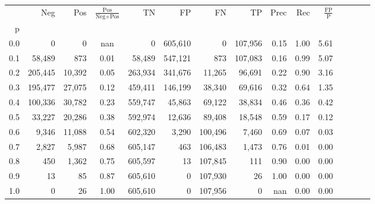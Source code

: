 \begin{tabular}{rrrcrrrrrrrrrrr}
\toprule
{} &      Neg &     Pos & $\frac{\text{Pos}}{\text{Neg}+\text{Pos}}$ &       TN &       FP &       FN &       TP &  Prec &   Rec & $\frac{\text{FP}}{\text{P}}$ \\
p   &          &         &                                            &          &          &          &          &       &       &                              \\
\midrule
0.0 &        0 &       0 &                                        nan &        0 &  605,610 &        0 &  107,956 &  0.15 &  1.00 &                         5.61 \\
0.1 &   58,489 &     873 &                                       0.01 &   58,489 &  547,121 &      873 &  107,083 &  0.16 &  0.99 &                         5.07 \\
0.2 &  205,445 &  10,392 &                                       0.05 &  263,934 &  341,676 &   11,265 &   96,691 &  0.22 &  0.90 &                         3.16 \\
0.3 &  195,477 &  27,075 &                                       0.12 &  459,411 &  146,199 &   38,340 &   69,616 &  0.32 &  0.64 &                         1.35 \\
0.4 &  100,336 &  30,782 &                                       0.23 &  559,747 &   45,863 &   69,122 &   38,834 &  0.46 &  0.36 &                         0.42 \\
0.5 &   33,227 &  20,286 &                                       0.38 &  592,974 &   12,636 &   89,408 &   18,548 &  0.59 &  0.17 &                         0.12 \\
0.6 &    9,346 &  11,088 &                                       0.54 &  602,320 &    3,290 &  100,496 &    7,460 &  0.69 &  0.07 &                         0.03 \\
0.7 &    2,827 &   5,987 &                                       0.68 &  605,147 &      463 &  106,483 &    1,473 &  0.76 &  0.01 &                         0.00 \\
0.8 &      450 &   1,362 &                                       0.75 &  605,597 &       13 &  107,845 &      111 &  0.90 &  0.00 &                         0.00 \\
0.9 &       13 &      85 &                                       0.87 &  605,610 &        0 &  107,930 &       26 &  1.00 &  0.00 &                         0.00 \\
1.0 &        0 &      26 &                                       1.00 &  605,610 &        0 &  107,956 &        0 &   nan &  0.00 &                         0.00 \\
\bottomrule
\end{tabular}
